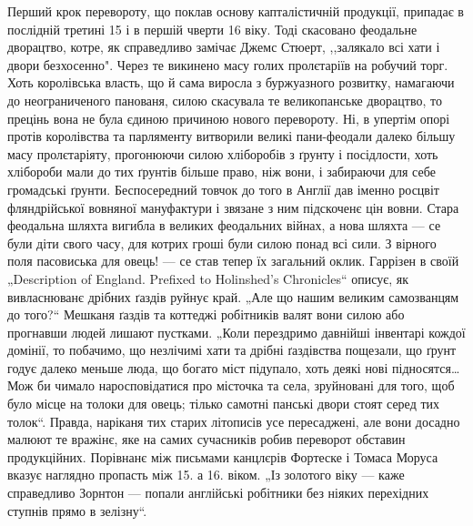 Перший крок перевороту, що поклав основу капталістичній продукції, припадає в послідній третині 15 і
в першій чверти 16 віку. Тоді скасовано феодальне дворацтво, котре, як справедливо замічає Джемс
Стюерт, ,,залякало  всі хати і двори безхосенно". Через те викинено масу голих пролєтаріїв на
робучий торг. Хоть королівська власть, що й сама виросла з буржуазного розвитку, намагаючи до
неограниченого панованя, силою скасувала те великопанське дворацтво, то прецінь вона не була єдиною
причиною нового перевороту. Ні, в упертім опорі протів королівства та
парляменту витворили великі пани-феодали далеко більшу масу пролєтаріяту, прогонюючи силою
хліборобів з ґрунту і посідлости, хоть хлібороби мали до тих ґрунтів більше право, ніж вони, і
забираючи для себе громадські ґрунти. Беспосередний товчок до того в Англії дав іменно росцвіт
фляндрійської вовняної мануфактури і звязане з ним підскоченє цін вовни. Стара феодальна шляхта
вигибла в великих феодальних війнах, а нова шляхта — се були діти свого часу, для котрих гроші були
силою понад всі сили. З вірного поля пасовиська для овець! — се став тепер їх загальний оклик.
Гаррізен в своїй „Description of England. Prefixed to Holinshed’s Chronicles“ описує, як
вивласнюванє дрібних ґаздів руйнує край. „Але що нашим великим самозванцям до того?“ Мешканя ґаздів
та коттеджі робітників валят вони силою або прогнавши людей лишают пустками. „Коли перездримо
давнійші інвентарі кождої домінії, то побачимо, що незлічимі хати та дрібні ґаздівства пощезали, що
ґрунт годує далеко меньше люда, що богато міст підупало, хоть деякі нові підносятся… Мож би
чимало наросповідатися про місточка та села, зруйновані для того, щоб було місце на толоки для
овець; тілько самотні панські двори стоят серед тих толок“. Правда, наріканя тих старих літописів
усе пересаджені, але вони досадно малюют те вражінє, яке на самих сучасників робив переворот
обставин продукційних. Порівнанє між письмами канцлєрів Фортеске і Томаса Моруса вказує наглядно
пропасть між 15. а 16. віком. „Із золотого віку — каже справедливо Зорнтон — попали англійські
робітники без ніяких перехідних ступнів прямо в зелізну“.

